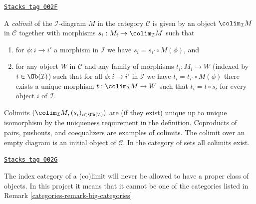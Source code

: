 \begin{definition}[Colimit]
\label{categories-definition-colimit}
\href{https://stacks.math.columbia.edu/tag/002F}{\texttt{Stacks tag 002F}}

A {\it colimit} of the $\mathcal{I}$-diagram $M$ in the category
$\mathcal{C}$ is given by an object $\colim_\mathcal{I} M$ in $\mathcal{C}$
together with morphisms $s_i : M_i \to \colim_\mathcal{I} M$ such that
\begin{enumerate}
\item for $\phi : i \to i'$ a morphism
in $\mathcal{I}$ we have $s_i = s_{i'} \circ M(\phi)$, and
\item for any object $W$ in $\mathcal{C}$ and any family of
morphisms $t_i : M_i \to W$ (indexed by $i \in \Ob(\mathcal{I})$)
such that for all $\phi : i \to i'$
in $\mathcal{I}$ we have $t_i = t_{i'} \circ M(\phi)$ there
exists a unique morphism $t : \colim_\mathcal{I} M \to W$ such that
$t_i = t \circ s_i$ for every object $i$ of $\mathcal{I}$.
\end{enumerate}
\end{definition}

Colimits $(\colim_\mathcal{I} M, (s_i)_{i\in \Ob(\mathcal{I})})$ are
(if they exist) unique up to unique isomorphism by the uniqueness requirement
in the definition. Coproducts of pairs, pushouts, and coequalizers are
examples of colimits. The colimit over an empty diagram is an initial object
of $\mathcal{C}$. In the category of sets all colimits exist.

\begin{remark}
\label{categories-remark-diagram-small}
\href{https://stacks.math.columbia.edu/tag/002G}{\texttt{Stacks tag 002G}}

The index category of a (co)limit will never be allowed to have
a proper class of objects. In this project it means that
it cannot be one of the categories listed in
Remark \ref{categories-remark-big-categories}
\end{remark}

